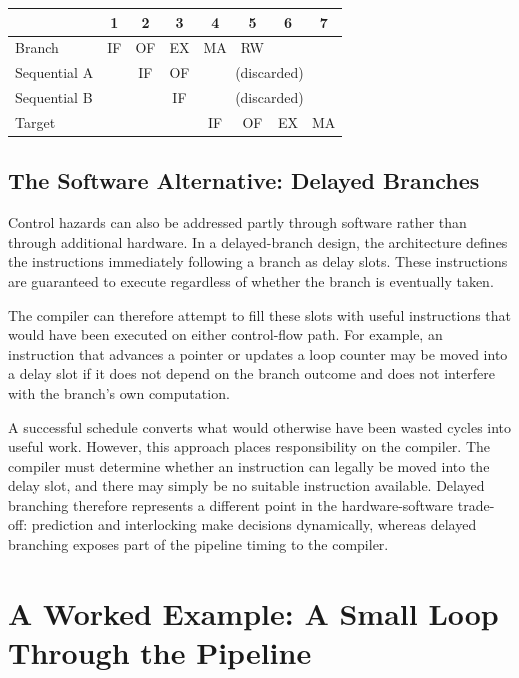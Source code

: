 \documentclass[11pt,a4paper]{report}
\begin{document}
\begin{center}
\begin{tabular}{lccccccc}
\toprule
& 1 & 2 & 3 & 4 & 5 & 6 & 7 \\
\midrule
Branch & IF & OF & EX & MA & RW & & \\
Sequential A & & IF & OF & \multicolumn{4}{c}{(discarded)} \\
Sequential B & & & IF & \multicolumn{4}{c}{(discarded)} \\
Target & & & & IF & OF & EX & MA \\
\bottomrule
\end{tabular}
\end{center}

\subsection{The Software Alternative: Delayed Branches}

Control hazards can also be addressed partly through software rather than through additional hardware. In a delayed-branch design, the architecture defines the instructions immediately following a branch as delay slots. These instructions are guaranteed to execute regardless of whether the branch is eventually taken.

The compiler can therefore attempt to fill these slots with useful instructions that would have been executed on either control-flow path. For example, an instruction that advances a pointer or updates a loop counter may be moved into a delay slot if it does not depend on the branch outcome and does not interfere with the branch's own computation.

A successful schedule converts what would otherwise have been wasted cycles into useful work. However, this approach places responsibility on the compiler. The compiler must determine whether an instruction can legally be moved into the delay slot, and there may simply be no suitable instruction available. Delayed branching therefore represents a different point in the hardware-software trade-off: prediction and interlocking make decisions dynamically, whereas delayed branching exposes part of the pipeline timing to the compiler.~\cite{sarangi}

\section{A Worked Example: A Small Loop Through the Pipeline}
\label{sec:worked-example}
\end{document}

